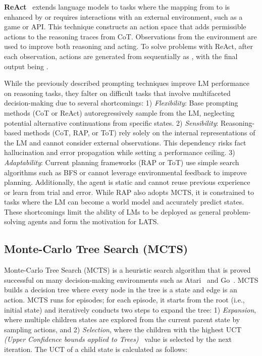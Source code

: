 \documentclass{article} \usepackage{iclr2024_conference,times}
\begin{document}
\textbf{ReAct}~\citep{yao2023react} extends language models to tasks where the mapping from  to  is enhanced by or requires interactions with an external environment, such as a game or API. This technique constructs an action space  that adds permissible actions  to the reasoning traces  from CoT. Observations  from the environment are used to improve both reasoning and acting. To solve problems with ReAct, after each observation, actions are generated from  sequentially as , with the final output being . 


While the previously described prompting techniques improve LM performance on reasoning tasks, they falter on difficult tasks that involve multifaceted decision-making due to several shortcomings: 1) \textit{Flexibility}: Base prompting methods (CoT or ReAct) autoregressively sample from the LM, neglecting potential alternative continuations from specific states. 2) \textit{Sensibility}: Reasoning-based methods (CoT, RAP, or ToT) rely solely on the internal representations of the LM and cannot consider external observations. This dependency risks fact hallucination and error propagation while setting a performance ceiling. 3) \textit{Adaptability}: Current planning frameworks (RAP or ToT) use simple search algorithms such as BFS or cannot leverage environmental feedback to improve planning. Additionally, the agent is static and cannot reuse previous experience or learn from trial and error. While RAP also adopts MCTS, it is constrained to tasks where the LM can become a world model and accurately predict states. These shortcomings limit the ability of LMs to be deployed as general problem-solving agents and form the motivation for LATS.


\subsection{Monte-Carlo Tree Search (MCTS)}
Monte-Carlo Tree Search (MCTS) is a heuristic search algorithm that is proved successful on many decision-making environments such as Atari~\citep{ye2021mastering} and Go~\citep{silver2016mastering}. MCTS builds a decision tree where every node in the tree is a state and edge is an action. MCTS runs for  episodes; for each episode, it starts from the root (i.e., initial state) and iteratively conducts two steps to expand the tree: 1) \textit{Expansion}, where multiple children states  are explored from the current parent state  by sampling  actions, and 2) \textit{Selection}, where the children with the highest UCT \textit{(Upper Confidence bounds applied to Trees)}~\citep{kocsis2006bandit} value is selected by the next iteration. The UCT of a child state  is calculated as follows:
\end{document}
